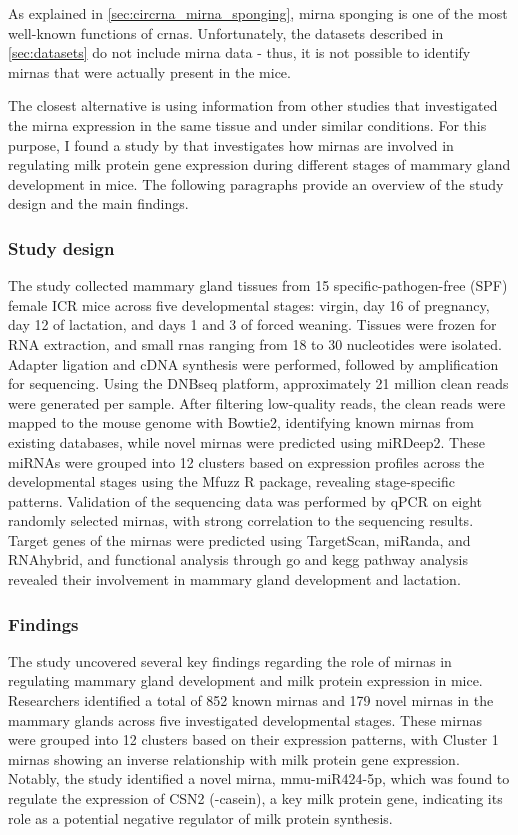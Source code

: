 As explained in \cref{sec:circrna_mirna_sponging}, \gls{mirna} sponging is one
of the most well-known functions of \glspl{crna}.
Unfortunately, the datasets described in \cref{sec:datasets} do not include
\gls{mirna} data - thus, it is not possible to identify \glspl{mirna} that were
actually present in the mice.

The closest alternative is using information from other studies that
investigated the \gls{mirna} expression in the same tissue and under similar
conditions.
For this purpose, I found a study by \textcite{wang_dynamic_2022} that
investigates how \glspl{mirna} are involved in regulating milk protein gene
expression during different stages of mammary gland development in mice.
The following paragraphs provide an overview of the study design and the main
findings.

\subsubsection{Study design}
The study collected mammary gland tissues from 15 specific-pathogen-free (SPF)
female ICR mice across five developmental stages: virgin, day 16 of pregnancy,
day 12 of lactation, and days 1 and 3 of forced weaning.
Tissues were frozen for RNA extraction, and small \glspl{rna} ranging from 18
to 30 nucleotides were isolated.
Adapter ligation and cDNA synthesis were performed, followed by amplification
for sequencing.
Using the DNBseq platform, approximately 21 million clean reads were generated
per sample.
After filtering low-quality reads, the clean reads were mapped to the mouse
genome with Bowtie2, identifying known \glspl{mirna} from existing databases,
while novel \glspl{mirna} were predicted using miRDeep2.
These miRNAs were grouped into 12 clusters based on expression profiles across
the developmental stages using the Mfuzz R package, revealing stage-specific
patterns.
Validation of the sequencing data was performed by qPCR on eight randomly
selected \glspl{mirna}, with strong correlation to the sequencing results.
Target genes of the \glspl{mirna} were predicted using TargetScan, miRanda, and
RNAhybrid, and functional analysis through \gls{go} and \gls{kegg} pathway
analysis revealed their involvement in mammary gland development and
lactation\supercite{wang_dynamic_2022}.

\subsubsection{Findings}
The study uncovered several key findings regarding the role of \glspl{mirna} in
regulating mammary gland development and milk protein expression in mice.
Researchers identified a total of 852 known \glspl{mirna} and 179 novel
\glspl{mirna} in the mammary glands across five investigated developmental
stages.
These \glspl{mirna} were grouped into 12 clusters based on their expression
patterns, with Cluster 1 \glspl{mirna} showing an inverse relationship with
milk protein gene expression.
Notably, the study identified a novel \gls{mirna}, mmu-miR424-5p, which was
found to regulate the expression of CSN2 (\textbeta{}-casein), a key milk
protein gene, indicating its role as a potential negative regulator of milk
protein synthesis\supercite{wang_dynamic_2022}.

